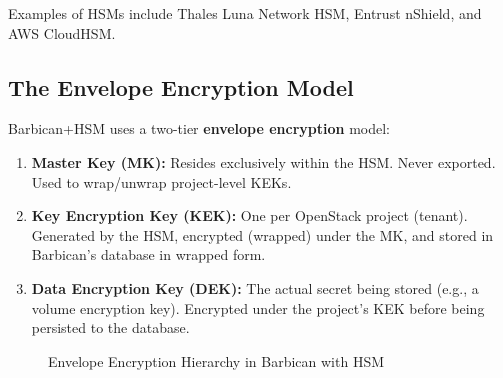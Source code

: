 \documentclass[12pt,a4paper,oneside]{report}
\begin{document}
Examples of HSMs include Thales Luna Network HSM, Entrust nShield, and AWS CloudHSM.

\subsection{The Envelope Encryption Model}

Barbican+HSM uses a two-tier \textbf{envelope encryption} model:

\begin{enumerate}
    \item \textbf{Master Key (MK):} Resides exclusively within the HSM. Never exported. Used to wrap/unwrap project-level KEKs.
    \item \textbf{Key Encryption Key (KEK):} One per OpenStack project (tenant). Generated by the HSM, encrypted (wrapped) under the MK, and stored in Barbican's database in wrapped form.
    \item \textbf{Data Encryption Key (DEK):} The actual secret being stored (e.g., a volume encryption key). Encrypted under the project's KEK before being persisted to the database.
\end{enumerate}

\begin{figure}[h]
\centering
{}
\caption{Envelope Encryption Hierarchy in Barbican with HSM}
\end{figure}
\end{document}
